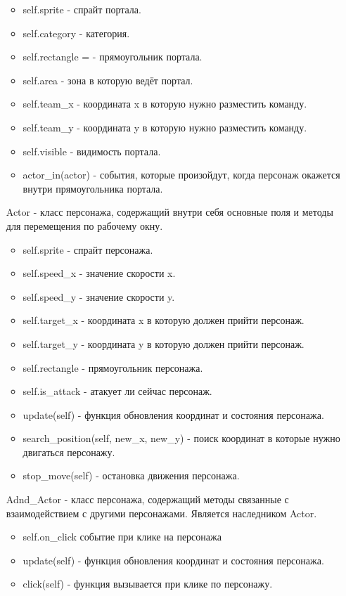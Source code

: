 \begin{enumerate}
\begin{itemize}
		\item self.sprite - спрайт портала.
		\item self.category - категория.
		\item self.rectangle = - прямоугольник портала.
		\item self.area - зона в которую ведёт портал.
		\item self.team\_x - координата x в  которую нужно разместить команду.
		\item self.team\_y - координата y в  которую нужно разместить команду.
		\item self.visible - видимость портала.
		\item actor\_in(actor) - события, которые произойдут, когда персонаж окажется внутри прямоугольника портала.
	\end{itemize}
	\item[Actor] - класс персонажа, содержащий внутри себя основные поля и методы для перемещения по рабочему окну.
	\begin{itemize}
		\item self.sprite - спрайт персонажа.
		\item self.speed\_x - значение скорости x.
		\item self.speed\_y - значение скорости y.
		\item self.target\_x - координата x в которую должен прийти персонаж.
		\item self.target\_y - координата y в которую должен прийти персонаж.
		\item self.rectangle - прямоугольник персонажа.
		\item self.is\_attack - атакует ли сейчас персонаж.
		\item update(self) - функция обновления координат и состояния персонажа.
		\item search\_position(self, new\_x, new\_y) - поиск координат в которые нужно двигаться персонажу.
		\item stop\_move(self) - остановка движения персонажа.
	\end{itemize}
	\item[Adnd\_Actor] - класс персонажа, содержащий методы связанные с взаимодействием с другими персонажами. Является наследником Actor.
	\begin{itemize}
		\item self.on\_click событие при клике на персонажа
		\item update(self) - функция обновления координат и состояния персонажа.
		\item click(self) - функция вызывается при клике по персонажу.

\end{itemize}
\end{enumerate}
